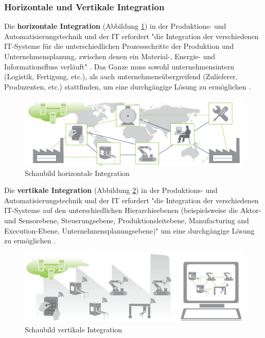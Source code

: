 \subsubsection{Horizontale und Vertikale Integration}\label{sec:HorizontaleVertikaleIntegration}
Die \textbf{horizontale Integration} (Abbildung \ref{fig:HorizontaleIntegration}) in der Produktions- und Automatisierungstechnik und der IT erfordert "die Integration der verschiedenen IT-Systeme für die unterschiedlichen Prozessschritte der Produktion und Unternehmensplanung, zwischen denen ein Material-, Energie- und Informationsfluss verläuft" \cite[S.24]{12}. Das Ganze muss sowohl unternehmensintern (Logistik, Fertigung, etc.), als auch unternehmensübergreifend (Zulieferer, Produzenten, etc.) stattfinden, um eine durchgängige Lösung zu ermöglichen \cite[S.24]{12}.
\begin{figure}[h]
	\centering
	\includegraphics[width=0.7\linewidth]{Bilder/A3_HorizontaleIntegration}
	\caption{Schaubild horizontale Integration \cite[S.35]{12}}
	\label{fig:HorizontaleIntegration}
\end{figure}
\newline
\noindent Die \textbf{vertikale Integration} (Abbildung \ref{fig:VertikaleIntegration}) in der Produktions- und Automatisierungstechnik und der IT erfordert "die Integration der verschiedenen IT-Systeme auf den unterschiedlichen Hierarchieebenen (beispielsweise die Aktor- und Sensorebene, Steuerungsebene, Produktionsleitebene, Manufacturing and Execution-Ebene, Unternehmensplanungsebene)" \cite[S.24]{12} um eine durchgängige Lösung zu ermöglichen \cite[S.24]{12}.
\begin{figure}[h]
	\centering
	\includegraphics[width=0.7\linewidth]{Bilder/A4_VertikaleIntegration}
	\caption{Schaubild vertikale Integration \cite[S.36]{12}}
	\label{fig:VertikaleIntegration}
\end{figure}

